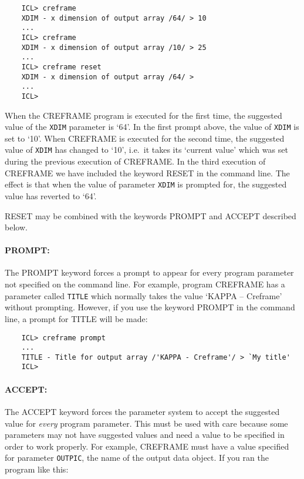 \begin{small}
\begin{verbatim}
    ICL> creframe
    XDIM - x dimension of output array /64/ > 10
    ...
    ICL> creframe
    XDIM - x dimension of output array /10/ > 25
    ...
    ICL> creframe reset
    XDIM - x dimension of output array /64/ >
    ...
    ICL>
\end{verbatim}
\end{small}

When the CREFRAME program is executed for the first time, the suggested value of
the {\small\tt XDIM} parameter is `64'.
In the first prompt above, the value of {\small\tt XDIM} is set to `10'.
When CREFRAME is executed for the second time, the suggested value of
{\small\tt XDIM} has changed to `10', i.e.\ it takes its `current value' which
was set during the previous execution of CREFRAME.
In the third execution of CREFRAME we have included the keyword RESET in the
command line.
The effect is that when the value of parameter {\small\tt XDIM} is prompted
for, the suggested value has reverted to `64'.

RESET may be combined with the keywords PROMPT and ACCEPT described below.

\paragraph{PROMPT:}\hfill

The PROMPT keyword forces a prompt to appear for every program parameter not
specified on the command line.
For example, program CREFRAME has a parameter called {\small\tt TITLE} which
normally takes the value `KAPPA -- Creframe' without prompting.
However, if you use the keyword PROMPT in the command line, a prompt for
TITLE will be made:

\begin{small}
\begin{verbatim}
    ICL> creframe prompt
    ...
    TITLE - Title for output array /'KAPPA - Creframe'/ > `My title'
    ICL>
\end{verbatim}
\end{small}

\paragraph{ACCEPT:}\hfill

The ACCEPT keyword forces the parameter system to accept the suggested
value for {\em every} program parameter.
This must be used with care because some parameters may not have suggested
values and need a value to be specified in order to work properly.
For example, CREFRAME must have a value specified for parameter
{\small\tt OUTPIC}, the name of the output data object.
If you ran the program like this:


